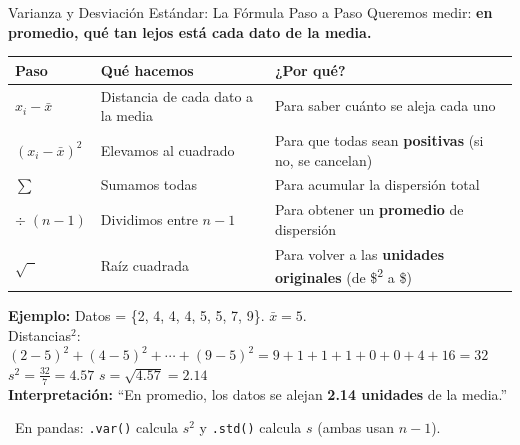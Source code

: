 \documentclass[aspectratio=169, 11pt]{beamer}
\begin{document}
\begin{frame}[shrink=15]{Varianza y Desviación Estándar: La Fórmula Paso a Paso}
  \vspace{-4pt}
  {\footnotesize
    Queremos medir: \textbf{en promedio, qué tan lejos está cada dato de la media.}}

  \vspace{4pt}
  \begin{center}
  \end{center}

  \vspace{4pt}
  {\scriptsize
  \begin{tabular}{@{}lll@{}}
    \toprule
    \textbf{Paso} & \textbf{Qué hacemos} & \textbf{¿Por qué?} \\
    \midrule
    $x_i - \bar{x}$ & Distancia de cada dato a la media & Para saber cuánto se aleja cada uno \\
    $(x_i - \bar{x})^2$ & Elevamos al cuadrado & Para que todas sean \textbf{positivas} (si no, se cancelan) \\
    $\sum$ & Sumamos todas & Para acumular la dispersión total \\
    $\div\;(n-1)$ & Dividimos entre $n{-}1$ & Para obtener un \textbf{promedio} de dispersión \\
    $\sqrt{\phantom{x}}$ & Raíz cuadrada & Para volver a las \textbf{unidades originales} (de \$\textsuperscript{2} a \$) \\
    \bottomrule
  \end{tabular}
  }

  \vspace{4pt}
  {\footnotesize\color{textDark}
    \textbf{Ejemplo:} Datos = \{2, 4, 4, 4, 5, 5, 7, 9\}. \quad $\bar{x} = 5$.\\[2pt]
    Distancias$^2$: $(2{-}5)^2 + (4{-}5)^2 + \cdots + (9{-}5)^2 = 9+1+1+1+0+0+4+16 = 32$\\[2pt]
    $s^2 = \frac{32}{7} = 4.57$ \qquad $s = \sqrt{4.57} = 2.14$\\[2pt]
    \textbf{Interpretación:} ``En promedio, los datos se alejan \textbf{2.14 unidades} de la media.''}

  \vspace{3pt}
  {\scriptsize\color{textMuted}
    \faLightbulb\ En pandas: \texttt{.var()} calcula $s^2$ y \texttt{.std()} calcula $s$ (ambas usan $n-1$).}
\end{frame}
\end{document}
